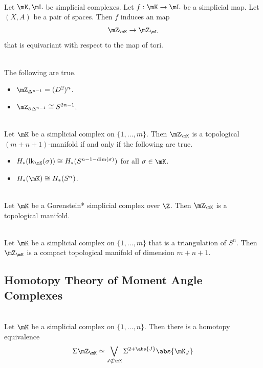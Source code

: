\documentclass[a4paper]{article}
\begin{document}
\begin{prp}{}{}\\
Let $\mK,\mL$ be simplicial complexes. Let $f:\mK\to\mL$ be a simplicial map. Let $(X,A)$ be a pair of spaces. Then $f$ induces an map $$\mZ_\mK\to\mZ_\mL$$ that is equivariant with respect to the map of tori. 
\end{prp}

\begin{eg}{}{}\\
The following are true. 
\begin{itemize}
\item $\mZ_{\Delta^{n-1}}=(D^2)^n$. 
\item $\mZ_{\partial\Delta^{n-1}}\cong S^{2n-1}$. 
\end{itemize}
\end{eg}

\begin{prp}{}{}\\
Let $\mK$ be a simplicial complex on $\{1,\dots,m\}$. Then $\mZ_\mK$ is a topological $(m+n+1)$-manifold if and only if the following are true. 
\begin{itemize}
\item $H_\ast(\text{lk}_\mK(\sigma))\cong H_\ast(S^{n-1-\dim(\sigma)})$ for all $\sigma\in\mK$. 
\item $H_\ast(\mK)\cong H_\ast(S^n)$. 
\end{itemize}
\end{prp}

\begin{crl}{}{}\\
Let $\mK$ be a Gorenstein* simplicial complex over $\Z$. Then $\mZ_\mK$ is a topological manifold. 
\end{crl}

\begin{crl}{}{}\\
Let $\mK$ be a simplicial complex on $\{1,\dots,m\}$ that is a triangulation of $S^n$. Then $\mZ_\mK$ is a compact topological manifold of dimension $m+n+1$. 
\end{crl}

\subsection{Homotopy Theory of Moment Angle Complexes}
\begin{crl}{}{}\\
Let $\mK$ be a simplicial complex on $\{1,\dots,n\}$. Then there is a homotopy equivalence $$\Sigma\mZ_\mK\simeq\bigvee_{J\notin\mK}\Sigma^{2+\abs{J}}\abs{\mK_J}$$
\end{crl}
\end{document}
